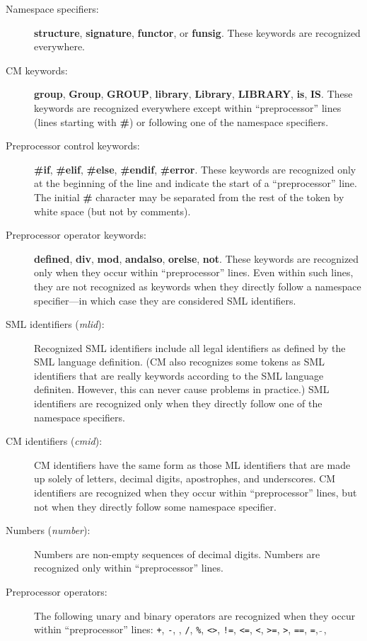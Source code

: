 \documentclass[titlepage,letterpaper]{article}
\newcommand{\nt}[1]{{\it #1}}
\begin{document}
\begin{description}
\item[Namespace specifiers:] {\bf structure}, {\bf signature},
{\bf functor}, or {\bf funsig}.  These keywords are recognized
everywhere.
\item[CM keywords:] {\bf group}, {\bf Group}, {\bf GROUP}, {\bf
library}, {\bf Library}, {\bf LIBRARY}, {\bf is}, {\bf IS}.  These
keywords are recognized everywhere except within ``preprocessor''
lines (lines starting with {\bf \#}) or following one of the namespace
specifiers.
\item[Preprocessor control keywords:] {\bf \#if}, {\bf \#elif}, {\bf
\#else}, {\bf \#endif}, {\bf \#error}.  These keywords are recognized
only at the beginning of the line and indicate the start of a
``preprocessor'' line.  The initial {\bf \#} character may be
separated from the rest of the token by white space (but not by comments).
\item[Preprocessor operator keywords:] {\bf defined}, {\bf div}, {\bf
mod}, {\bf andalso}, {\bf orelse}, {\bf not}.  These keywords are
recognized only when they occur within ``preprocessor'' lines.  Even
within such lines, they are not recognized as keywords when they
directly follow a namespace specifier---in which case they are
considered SML identifiers.
\item[SML identifiers (\nt{mlid}):] Recognized SML identifiers
include all legal identifiers as defined by the SML language
definition. (CM also recognizes some tokens as SML identifiers that
are really keywords according to the SML language definiten. However,
this can never cause problems in practice.)  SML identifiers are
recognized only when they directly follow one of the namespace
specifiers.
\item[CM identifiers (\nt{cmid}):] CM identifiers have the same form
as those ML identifiers that are made up solely of letters, decimal
digits, apostrophes, and underscores.  CM identifiers are recognized when they
occur within ``preprocessor'' lines, but not when they directly follow
some namespace specifier.
\item[Numbers (\nt{number}):] Numbers are non-empty sequences of
decimal digits.  Numbers are recognized only within ``preprocessor''
lines.
\item[Preprocessor operators:] The following unary and binary operators are
recognized when they occur within ``preprocessor'' lines: {\tt +},
{\tt -}, {\tt *}, {\tt /}, {\tt \%}, {\tt <>}, {\tt !=}, {\tt <=},
{\tt <}, {\tt >=}, {\tt >}, {\tt ==}, {\tt =}, $\tilde{~}$, {\tt
}
\end{description}
\end{document}
